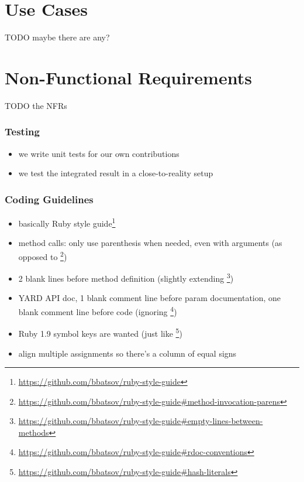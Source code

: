 \section{Use Cases}
TODO maybe there are any?

\section{Non-Functional Requirements}
TODO the NFRs

\subsubsection{Testing}
\begin{itemize}
	\item we write unit tests for our own contributions
	\item we test the integrated result in a close-to-reality setup
\end{itemize}


\subsubsection{Coding Guidelines}
\begin{itemize}
	\item basically Ruby style guide\footnote{\url{https://github.com/bbatsov/ruby-style-guide}}
	\item method calls: only use parenthesis when needed, even with arguments (as opposed to \footnote{\url{https://github.com/bbatsov/ruby-style-guide\#method-invocation-parens}})
	\item 2 blank lines before method definition (slightly extending \footnote{\url{https://github.com/bbatsov/ruby-style-guide\#empty-lines-between-methods}})
	\item YARD API doc, 1 blank comment line before param documentation, one blank comment line before code (ignoring \footnote{\url{https://github.com/bbatsov/ruby-style-guide\#rdoc-conventions}})
	\item Ruby 1.9 symbol keys are wanted (just like \footnote{\url{https://github.com/bbatsov/ruby-style-guide\#hash-literals}})
	\item align multiple assignments so there's a column of equal signs
\end{itemize}
